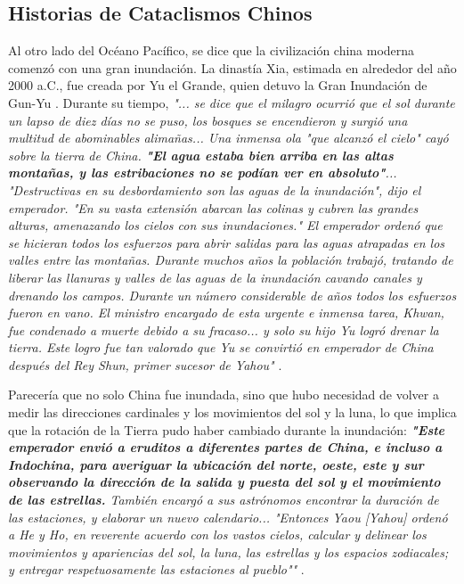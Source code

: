 \documentclass[10pt,twocolumn,letterpaper]{article}
\begin{document}
\subsection{Historias de Cataclismos Chinos}

Al otro lado del Océano Pacífico, se dice que la civilización china moderna comenzó con una gran inundación. La dinastía Xia, estimada en alrededor del año 2000 a.C., fue creada por Yu el Grande, quien detuvo la Gran Inundación de Gun-Yu \cite{6}. Durante su tiempo, \textit{"... se dice que el milagro ocurrió que el sol durante un lapso de diez días no se puso, los bosques se encendieron y surgió una multitud de abominables alimañas... Una inmensa ola "que alcanzó el cielo" cayó sobre la tierra de China. \textbf{"El agua estaba bien arriba en las altas montañas, y las estribaciones no se podían ver en absoluto"}... "Destructivas en su desbordamiento son las aguas de la inundación", dijo el emperador. "En su vasta extensión abarcan las colinas y cubren las grandes alturas, amenazando los cielos con sus inundaciones." El emperador ordenó que se hicieran todos los esfuerzos para abrir salidas para las aguas atrapadas en los valles entre las montañas. Durante muchos años la población trabajó, tratando de liberar las llanuras y valles de las aguas de la inundación cavando canales y drenando los campos. Durante un número considerable de años todos los esfuerzos fueron en vano. El ministro encargado de esta urgente e inmensa tarea, Khwan, fue condenado a muerte debido a su fracaso... y solo su hijo Yu logró drenar la tierra. Este logro fue tan valorado que Yu se convirtió en emperador de China después del Rey Shun, primer sucesor de Yahou"} \cite{5}.

Parecería que no solo China fue inundada, sino que hubo necesidad de volver a medir las direcciones cardinales y los movimientos del sol y la luna, lo que implica que la rotación de la Tierra pudo haber cambiado durante la inundación: \textit{\textbf{"Este emperador envió a eruditos a diferentes partes de China, e incluso a Indochina, para averiguar la ubicación del norte, oeste, este y sur observando la dirección de la salida y puesta del sol y el movimiento de las estrellas.} También encargó a sus astrónomos encontrar la duración de las estaciones, y elaborar un nuevo calendario... "Entonces Yaou [Yahou] ordenó a He y Ho, en reverente acuerdo con los vastos cielos, calcular y delinear los movimientos y apariencias del sol, la luna, las estrellas y los espacios zodiacales; y entregar respetuosamente las estaciones al pueblo""} \cite{5}.
\end{document}
